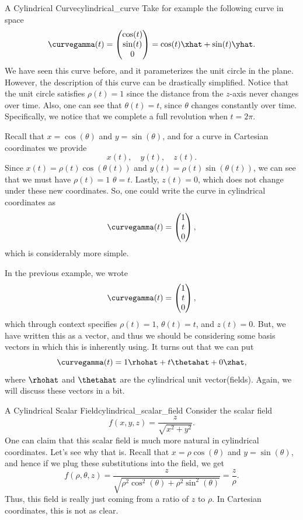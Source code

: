 \begin{ex}{A Cylindrical Curve}{cylindrical_curve}
    Take for example the following curve in space
    \[
    \curvegamma(t) = \begin{pmatrix} \cos(t) \\ \sin(t) \\ 0 \end{pmatrix} = \cos(t)\xhat + \sin(t)\yhat.
    \]
    We have seen this curve before, and it parameterizes the unit circle in the plane.  However, the description of this curve can be drastically simplified.  Notice that the unit circle satisfies $\rho(t)=1$ since the distance from the $z$-axis never changes over time.  Also, one can see that $\theta(t)=t$, since $\theta$ changes constantly over time.  Specifically, we notice that we complete a full revolution when $t=2\pi$.
    
    Recall that $x=\cos(\theta)$ and $y=\sin(\theta)$, and for a curve in Cartesian coordinates we provide
    \[
    x(t), \quad y(t), \quad z(t).
    \]
    Since $x(t)=\rho(t)\cos(\theta(t))$ and $y(t)=\rho(t)\sin(\theta(t))$, we can see that we must have $\rho(t)=1$ $\theta=t$. Lastly, $z(t)=0$, which does not change under these new coordinates.  So, one could write the curve in cylindrical coordinates as
    \[
    \curvegamma(t) = \begin{pmatrix} 1 \\ t \\ 0 \end{pmatrix},
    \]
    which is considerably more simple.  
\end{ex}

In the previous example, we wrote
\[
\curvegamma(t) = \begin{pmatrix} 1 \\ t \\ 0 \end{pmatrix},
\]
which through context specifies $\rho(t)=1$, $\theta(t)=t$, and $z(t)=0$.  But, we have written this as a vector, and thus we should be considering some basis vectors in which this is inherently using.  It turns out that we can put
\[
\curvegamma(t) = 1\rhohat + t \thetahat + 0\zhat,
\]
where $\rhohat$ and $\thetahat$ are the cylindrical unit vector(fields).  Again, we will discuss these vectors in a bit.

\begin{ex}{A Cylindrical Scalar Field}{cylindrical_scalar_field}
    Consider the scalar field
    \[
    f(x,y,z) = \frac{z}{\sqrt{x^2+y^2}}.
    \]
    One can claim that this scalar field is much more natural in cylindrical coordinates.  Let's see why that is.  Recall that $x=\rho\cos(\theta)$ and $y=\sin(\theta)$, and hence if we plug these substitutions into the field, we get
    \[
    f(\rho,\theta,z) = \frac{z}{\sqrt{\rho^2 \cos^2(\theta) + \rho^2 \sin^2(\theta)}} = \frac{z}{\rho}.
    \]
    Thus, this field is really just coming from a ratio of $z$ to $\rho$.  In Cartesian coordinates, this is not as clear.
\end{ex}

